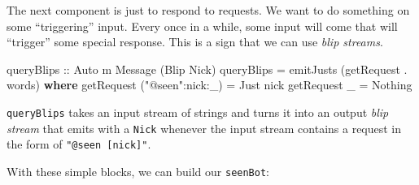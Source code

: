 \documentclass[]{article}
\newenvironment{Shaded}{}{}
\newcommand{\CommentTok}[1]{\textcolor[rgb]{0.38,0.63,0.69}{\textit{#1}}}
\newcommand{\DataTypeTok}[1]{\textcolor[rgb]{0.56,0.13,0.00}{#1}}
\newcommand{\FunctionTok}[1]{\textcolor[rgb]{0.02,0.16,0.49}{#1}}
\newcommand{\KeywordTok}[1]{\textcolor[rgb]{0.00,0.44,0.13}{\textbf{#1}}}
\newcommand{\NormalTok}[1]{#1}
\newcommand{\OperatorTok}[1]{\textcolor[rgb]{0.40,0.40,0.40}{#1}}
\newcommand{\OtherTok}[1]{\textcolor[rgb]{0.00,0.44,0.13}{#1}}
\newcommand{\StringTok}[1]{\textcolor[rgb]{0.25,0.44,0.63}{#1}}
\begin{document}
\begin{Shaded}
\end{Shaded}

The next component is just to respond to requests. We want to do something on
some ``triggering'' input. Every once in a while, some input will come that will
``trigger'' some special response. This is a sign that we can use \emph{blip
streams}.

\begin{Shaded}
\begin{Highlighting}[]
\OtherTok{queryBlips ::} \DataTypeTok{Auto}\NormalTok{ m }\DataTypeTok{Message}\NormalTok{ (}\DataTypeTok{Blip} \DataTypeTok{Nick}\NormalTok{)}
\NormalTok{queryBlips }\OtherTok{=}\NormalTok{ emitJusts (getRequest }\OperatorTok{.} \FunctionTok{words}\NormalTok{)}
  \KeywordTok{where}
\NormalTok{    getRequest (}\StringTok{"@seen"}\OperatorTok{:}\NormalTok{nick}\OperatorTok{:}\NormalTok{\_) }\OtherTok{=} \DataTypeTok{Just}\NormalTok{ nick}
\NormalTok{    getRequest \_                }\OtherTok{=} \DataTypeTok{Nothing}
\end{Highlighting}
\end{Shaded}

\texttt{queryBlips} takes an input stream of strings and turns it into an output
\emph{blip stream} that emits with a \texttt{Nick} whenever the input stream
contains a request in the form of \texttt{"@seen\ {[}nick{]}"}.

With these simple blocks, we can build our \texttt{seenBot}:
\end{document}
